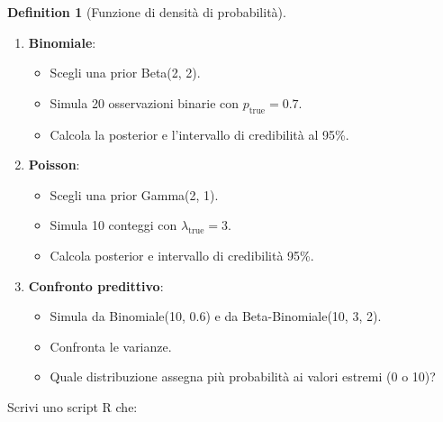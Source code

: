 \documentclass[
  letterpaper,
  DIV=11,
  numbers=noendperiod,
  oneside]{scrreprt}
\providecommand{\tightlist}{%
  \setlength{\itemsep}{0pt}\setlength{\parskip}{0pt}}
\theoremstyle{definition}
\theoremstyle{plain}
\theoremstyle{definition}
\newtheorem{definition}{Definition}[chapter]
\theoremstyle{remark}
\begin{document}
\begin{definition}[Funzione di densità di
probabilità]
\begin{tcolorbox}
\begin{enumerate}
\def\labelenumi{\arabic{enumi}.}
\tightlist
\item
  \textbf{Binomiale}:

  \begin{itemize}
  \tightlist
  \item
    Scegli una prior Beta(2, 2).
  \item
    Simula 20 osservazioni binarie con \(p_{\text{true}} = 0.7\).
  \item
    Calcola la posterior e l'intervallo di credibilità al 95\%.
  \end{itemize}
\item
  \textbf{Poisson}:

  \begin{itemize}
  \tightlist
  \item
    Scegli una prior Gamma(2, 1).
  \item
    Simula 10 conteggi con \(\lambda_{\text{true}} = 3\).
  \item
    Calcola posterior e intervallo di credibilità 95\%.
  \end{itemize}
\item
  \textbf{Confronto predittivo}:

  \begin{itemize}
  \tightlist
  \item
    Simula da Binomiale(10, 0.6) e da Beta-Binomiale(10, 3, 2).
  \item
    Confronta le varianze.
  \item
    Quale distribuzione assegna più probabilità ai valori estremi (0 o
    10)?
  \end{itemize}
\end{enumerate}

\end{tcolorbox}

\begin{tcolorbox}[enhanced jigsaw, arc=.35mm, breakable, colbacktitle=quarto-callout-important-color!10!white, opacityback=0, toprule=.15mm, rightrule=.15mm, colback=white, opacitybacktitle=0.6, leftrule=.75mm, coltitle=black, bottomtitle=1mm, left=2mm, toptitle=1mm, title=\textcolor{quarto-callout-important-color}{\faExclamation}\hspace{0.5em}{Progetto: Apprendimento sequenziale}, titlerule=0mm, bottomrule=.15mm, colframe=quarto-callout-important-color-frame]

Scrivi uno script R che:


\end{tcolorbox}
\end{definition}
\end{document}

